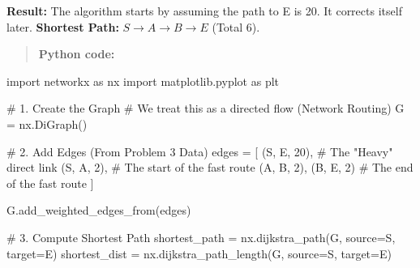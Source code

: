 \documentclass[
  letterpaper,
  DIV=11,
  numbers=noendperiod]{scrreprt}
\newenvironment{Shaded}{\begin{snugshade}}{\end{snugshade}}
\newcommand{\CommentTok}[1]{\textcolor[rgb]{0.37,0.37,0.37}{#1}}
\newcommand{\DecValTok}[1]{\textcolor[rgb]{0.68,0.00,0.00}{#1}}
\newcommand{\ImportTok}[1]{\textcolor[rgb]{0.00,0.46,0.62}{#1}}
\newcommand{\NormalTok}[1]{\textcolor[rgb]{0.00,0.23,0.31}{#1}}
\newcommand{\OperatorTok}[1]{\textcolor[rgb]{0.37,0.37,0.37}{#1}}
\newcommand{\StringTok}[1]{\textcolor[rgb]{0.13,0.47,0.30}{#1}}
\begin{document}
\textbf{Result:} The algorithm starts by assuming the path to E is 20.
It corrects itself later. \textbf{Shortest Path:}
\(S \to A \to B \to E\) (Total 6).

\begin{quote}
\textbf{Python code:}
\end{quote}

\begin{Shaded}
\begin{Highlighting}[]
\ImportTok{import}\NormalTok{ networkx }\ImportTok{as}\NormalTok{ nx}
\ImportTok{import}\NormalTok{ matplotlib.pyplot }\ImportTok{as}\NormalTok{ plt}

\CommentTok{\# 1. Create the Graph}
\CommentTok{\# We treat this as a directed flow (Network Routing)}
\NormalTok{G }\OperatorTok{=}\NormalTok{ nx.DiGraph()}

\CommentTok{\# 2. Add Edges (From Problem 3 Data)}
\NormalTok{edges }\OperatorTok{=}\NormalTok{ [}
\NormalTok{    (}\StringTok{\textquotesingle{}S\textquotesingle{}}\NormalTok{, }\StringTok{\textquotesingle{}E\textquotesingle{}}\NormalTok{, }\DecValTok{20}\NormalTok{), }\CommentTok{\# The "Heavy" direct link}
\NormalTok{    (}\StringTok{\textquotesingle{}S\textquotesingle{}}\NormalTok{, }\StringTok{\textquotesingle{}A\textquotesingle{}}\NormalTok{, }\DecValTok{2}\NormalTok{),  }\CommentTok{\# The start of the fast route}
\NormalTok{    (}\StringTok{\textquotesingle{}A\textquotesingle{}}\NormalTok{, }\StringTok{\textquotesingle{}B\textquotesingle{}}\NormalTok{, }\DecValTok{2}\NormalTok{),}
\NormalTok{    (}\StringTok{\textquotesingle{}B\textquotesingle{}}\NormalTok{, }\StringTok{\textquotesingle{}E\textquotesingle{}}\NormalTok{, }\DecValTok{2}\NormalTok{)   }\CommentTok{\# The end of the fast route}
\NormalTok{]}

\NormalTok{G.add\_weighted\_edges\_from(edges)}

\CommentTok{\# 3. Compute Shortest Path}
\NormalTok{shortest\_path }\OperatorTok{=}\NormalTok{ nx.dijkstra\_path(G, source}\OperatorTok{=}\StringTok{\textquotesingle{}S\textquotesingle{}}\NormalTok{, target}\OperatorTok{=}\StringTok{\textquotesingle{}E\textquotesingle{}}\NormalTok{)}
\NormalTok{shortest\_dist }\OperatorTok{=}\NormalTok{ nx.dijkstra\_path\_length(G, source}\OperatorTok{=}\StringTok{\textquotesingle{}S\textquotesingle{}}\NormalTok{, target}\OperatorTok{=}\StringTok{\textquotesingle{}E\textquotesingle{}}\NormalTok{)}


\end{Highlighting}
\end{Shaded}
\end{document}
